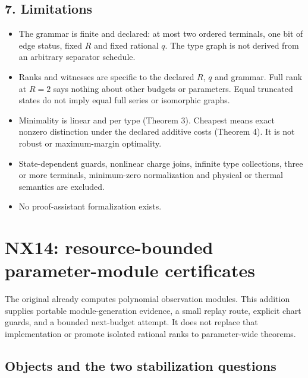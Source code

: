 \documentclass[
  11pt,
  a4paper,
]{report}
\providecommand{\tightlist}{%
  \setlength{\itemsep}{0pt}\setlength{\parskip}{0pt}}
\let\singularitytexttt\texttt
\renewcommand{\texttt}[1]{\singularitytexttt{\seqsplit{#1}}}
\begin{document}
\hypertarget{limitations-1}{%
\section{7. Limitations}\label{limitations-1}}

\begin{itemize}
\tightlist
\item
  The grammar is finite and declared: at most two ordered terminals, one
  bit of edge status, fixed \(R\) and fixed rational \(q\). The type
  graph is not derived from an arbitrary separator schedule.
\item
  Ranks and witnesses are specific to the declared \(R\), \(q\) and
  grammar. Full rank at \(R=2\) says nothing about other budgets or
  parameters. Equal truncated states do not imply equal full series or
  isomorphic graphs.
\item
  Minimality is linear and per type (Theorem 3). Cheapest means exact
  nonzero distinction under the declared additive costs (Theorem 4). It
  is not robust or maximum-margin optimality.
\item
  State-dependent guards, nonlinear charge joins, infinite type
  collections, three or more terminals, minimum-zero normalization and
  physical or thermal semantics are excluded.
\item
  No proof-assistant formalization exists.
\end{itemize}

\hypertarget{nx14-resource-bounded-parameter-module-certificates}{%
\chapter{NX14: resource-bounded parameter-module
certificates}\label{nx14-resource-bounded-parameter-module-certificates}}

The original \texttt{parametric.py} already computes polynomial
observation modules. This addition supplies portable module-generation
evidence, a small replay route, explicit chart guards, and a bounded
next-budget attempt. It does not replace that implementation or promote
isolated rational ranks to parameter-wide theorems.

\hypertarget{objects-and-the-two-stabilization-questions}{%
\section{Objects and the two stabilization
questions}\label{objects-and-the-two-stabilization-questions}}
\end{document}
